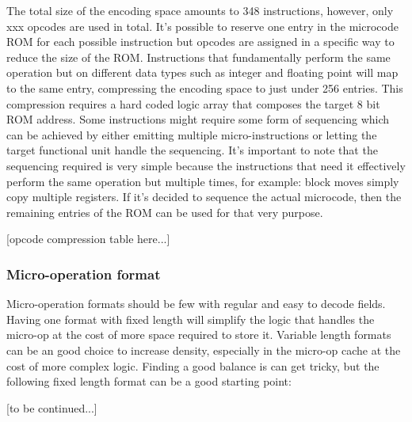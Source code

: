                 The total size of the encoding space amounts to 348 instructions, however, only xxx opcodes are used in total. It's possible to reserve one entry in the microcode ROM for each possible instruction but opcodes are assigned in a specific way to reduce the size of the ROM. Instructions that fundamentally perform the same operation but on different data types such as integer and floating point will map to the same entry, compressing the encoding space to just under 256 entries. This compression requires a hard coded logic array that composes the target 8 bit ROM address. Some instructions might require some form of sequencing which can be achieved by either emitting multiple micro-instructions or letting the target functional unit handle the sequencing. It's important to note that the sequencing required is very simple because the instructions that need it effectively perform the same operation but multiple times, for example: block moves simply copy multiple registers. If it's decided to sequence the actual microcode, then the remaining entries of the ROM can be used for that very purpose.

                [opcode compression table here...]

            \subsubsection{Micro-operation format}

                Micro-operation formats should be few with regular and easy to decode fields. Having one format with fixed length will simplify the logic that handles the micro-op at the cost of more space required to store it. Variable length formats can be an good choice to increase density, especially in the micro-op cache at the cost of more complex logic. Finding a good balance is can get tricky, but the following fixed length format can be a good starting point:

                [to be continued...]


